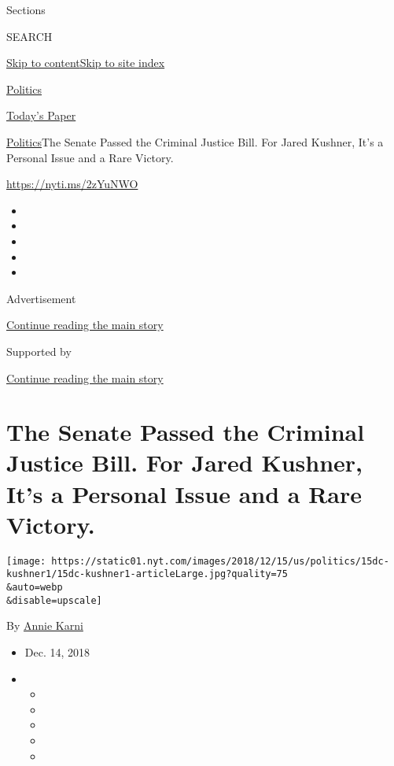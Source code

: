 Sections

SEARCH

\protect\hyperlink{site-content}{Skip to
content}\protect\hyperlink{site-index}{Skip to site index}

\href{https://www.nytimes.com/section/politics}{Politics}

\href{https://myaccount.nytimes.com/auth/login?response_type=cookie\&client_id=vi}{}

\href{https://www.nytimes.com/section/todayspaper}{Today's Paper}

\href{/section/politics}{Politics}\textbar{}The Senate Passed the
Criminal Justice Bill. For Jared Kushner, It's a Personal Issue and a
Rare Victory.

\url{https://nyti.ms/2zYuNWO}

\begin{itemize}
\item
\item
\item
\item
\item
\end{itemize}

Advertisement

\protect\hyperlink{after-top}{Continue reading the main story}

Supported by

\protect\hyperlink{after-sponsor}{Continue reading the main story}

\hypertarget{the-senate-passed-the-criminal-justice-bill-for-jared-kushner-its-a-personal-issue-and-a-rare-victory}{%
\section{The Senate Passed the Criminal Justice Bill. For Jared Kushner,
It's a Personal Issue and a Rare
Victory.}\label{the-senate-passed-the-criminal-justice-bill-for-jared-kushner-its-a-personal-issue-and-a-rare-victory}}

\texttt{[image: https://static01.nyt.com/images/2018/12/15/us/politics/15dc-kushner1/15dc-kushner1-articleLarge.jpg?quality=75\\\&auto=webp\\\&disable=upscale]}

By \href{https://www.nytimes.com/by/annie-karni}{Annie Karni}

\begin{itemize}
\item
  Dec. 14, 2018
\item
  \begin{itemize}
  \item
  \item
  \item
  \item
  \item
  \end{itemize}
\end{itemize}

